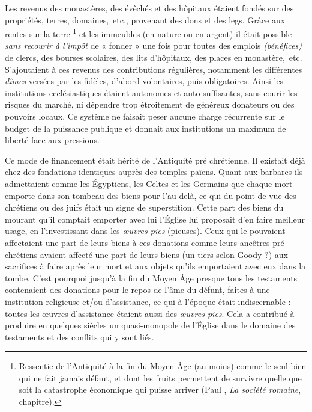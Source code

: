  Les revenus des monastères, des évêchés et des hôpitaux étaient fondés sur des propriétés, terres, domaines,~etc., provenant des dons et des legs. Grâce aux rentes sur la terre
\footnote{Ressentie de l'Antiquité à la fin du Moyen Âge (au moins) comme le seul bien qui ne fait jamais défaut, et dont les fruits permettent de survivre quelle que soit la catastrophe économique qui puisse arriver (Paul , \emph{La société romaine}, chapitre).} 
et les immeubles (en nature ou en argent) il était possible \emph{sans recourir à l'impôt} de « fonder » une fois pour toutes des emplois \emph{(bénéfices)} de clercs, des bourses scolaires, des lits d'hôpitaux, des places en monastère,~etc.  S'ajoutaient à ces revenus des contributions régulières, notamment les différentes \emph{dîmes} versées par les fidèles, d'abord volontaires, puis obligatoires. Ainsi les institutions ecclésiastiques étaient autonomes et auto-suffisantes, sans courir les risques du marché, ni dépendre trop étroitement de généreux donateurs ou des pouvoirs locaux. Ce système ne faisait peser aucune charge récurrente sur le budget de la puissance publique et donnait aux institutions un maximum de liberté face aux pressions. 

  Ce mode de financement était hérité de l'Antiquité pré chrétienne. Il existait déjà chez des fondations identiques auprès des temples païens. Quant aux barbares ils admettaient comme les Égyptiens, les Celtes et les Germains que chaque mort emporte dans son tombeau des biens pour l'au-delà, ce qui du point de vue des chrétiens ou des juifs était un signe de superstition. Cette part des biens du mourant qu'il comptait emporter avec lui l'Église lui proposait d'en faire meilleur usage, en l'investissant dans les \emph{œuvres pies} (pieuses). Ceux qui le pouvaient affectaient une part de leurs biens à ces donations comme leurs ancêtres pré chrétiens avaient affecté une part de leurs biens (un tiers selon Goody ?) aux sacrifices à faire après leur mort et aux objets qu'ils emportaient avec eux dans la tombe. C'est pourquoi jusqu'à la fin du Moyen Âge presque tous les testaments contenaient des donations pour le repos de l'âme du défunt, faites à une institution religieuse et/ou d'assistance, ce qui à l'époque était indiscernable : toutes les œuvres d'assistance étaient aussi des \emph{œuvres pies}. Cela a contribué à produire en quelques siècles un quasi-monopole de l'Église dans le domaine des testaments et des conflits qui y sont liés.
 
